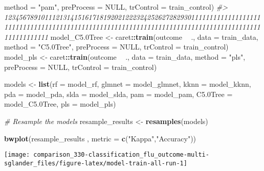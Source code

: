 \documentclass[]{book}
\newenvironment{Shaded}{\begin{snugshade}}{\end{snugshade}}
\newcommand{\CommentTok}[1]{\textcolor[rgb]{0.56,0.35,0.01}{\textit{#1}}}
\newcommand{\DataTypeTok}[1]{\textcolor[rgb]{0.13,0.29,0.53}{#1}}
\newcommand{\FloatTok}[1]{\textcolor[rgb]{0.00,0.00,0.81}{#1}}
\newcommand{\KeywordTok}[1]{\textcolor[rgb]{0.13,0.29,0.53}{\textbf{#1}}}
\newcommand{\NormalTok}[1]{#1}
\newcommand{\OperatorTok}[1]{\textcolor[rgb]{0.81,0.36,0.00}{\textbf{#1}}}
\newcommand{\OtherTok}[1]{\textcolor[rgb]{0.56,0.35,0.01}{#1}}
\newcommand{\StringTok}[1]{\textcolor[rgb]{0.31,0.60,0.02}{#1}}
\begin{document}
\begin{Shaded}
\begin{Highlighting}[]
                             \DataTypeTok{method =} \StringTok{"pam"}\NormalTok{,}
                             \DataTypeTok{preProcess =} \OtherTok{NULL}\NormalTok{,}
                             \DataTypeTok{trControl =}\NormalTok{ train_control)}
\CommentTok{#> 12345678910111213141516171819202122232425262728293011111111111111111111111111111111111111111111111111111111111111111111111111111111111111111111111111111}
\NormalTok{model_C5}\FloatTok{.0}\NormalTok{Tree <-}\StringTok{ }\NormalTok{caret}\OperatorTok{::}\KeywordTok{train}\NormalTok{(outcome }\OperatorTok{~}\StringTok{ }\NormalTok{.,}
                             \DataTypeTok{data =}\NormalTok{ train_data,}
                             \DataTypeTok{method =} \StringTok{"C5.0Tree"}\NormalTok{,}
                             \DataTypeTok{preProcess =} \OtherTok{NULL}\NormalTok{,}
                             \DataTypeTok{trControl =}\NormalTok{ train_control)}
\NormalTok{model_pls <-}\StringTok{ }\NormalTok{caret}\OperatorTok{::}\KeywordTok{train}\NormalTok{(outcome }\OperatorTok{~}\StringTok{ }\NormalTok{.,}
                             \DataTypeTok{data =}\NormalTok{ train_data,}
                             \DataTypeTok{method =} \StringTok{"pls"}\NormalTok{,}
                             \DataTypeTok{preProcess =} \OtherTok{NULL}\NormalTok{,}
                             \DataTypeTok{trControl =}\NormalTok{ train_control)}

\NormalTok{models <-}\StringTok{ }\KeywordTok{list}\NormalTok{(}\DataTypeTok{rf =}\NormalTok{ model_rf, }
               \DataTypeTok{glmnet   =}\NormalTok{ model_glmnet, }
               \DataTypeTok{kknn     =}\NormalTok{ model_kknn, }
               \DataTypeTok{pda      =}\NormalTok{ model_pda, }
               \DataTypeTok{slda     =}\NormalTok{ model_slda,}
               \DataTypeTok{pam      =}\NormalTok{ model_pam, }
               \DataTypeTok{C5.0Tree =}\NormalTok{ model_C5}\FloatTok{.0}\NormalTok{Tree, }
               \DataTypeTok{pls      =}\NormalTok{ model_pls)}

\CommentTok{# Resample the models}
\NormalTok{resample_results <-}\StringTok{ }\KeywordTok{resamples}\NormalTok{(models)}

\KeywordTok{bwplot}\NormalTok{(resample_results , }\DataTypeTok{metric =} \KeywordTok{c}\NormalTok{(}\StringTok{"Kappa"}\NormalTok{,}\StringTok{"Accuracy"}\NormalTok{))}
\end{Highlighting}
\end{Shaded}

\begin{center}\texttt{[image: comparison\_330-classification\_flu\_outcome-multi-sglander\_files/figure-latex/model-train-all-run-1]} \end{center}
\end{document}
